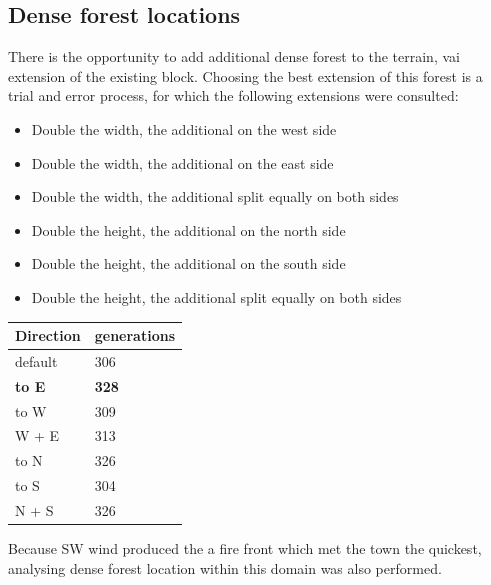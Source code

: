 \documentclass[11pt, a4paper, titlepage]{article}
\begin{document}
      



\subsection{Dense forest locations}
There is the opportunity to add additional dense forest to the terrain, vai extension of the existing block. Choosing the best extension of this forest is a trial and error process, for which the following extensions were consulted:
 \begin{itemize}
   \item Double the width, the additional on the west side
   \item Double the width, the additional on the east side
   \item Double the width, the additional split equally on both sides
   \item Double the height, the additional on the north side
   \item Double the height, the additional on the south side
   \item Double the height, the additional split equally on both sides

 \end{itemize}

 \begin{table}[H]
  \centering
  \begin{tabular}{|l|l|}
  \hline
  Direction & generations \\ \hline
  default & 306 \\ \hline
  \textbf{to E}    & \textbf{328} \\ \hline
  to W    & 309 \\ \hline
  W + E   & 313 \\ \hline
  to N    & 326 \\ \hline
  to S    & 304 \\ \hline
  N + S    & 326 \\ \hline
  
  
  
  
  \end{tabular}
  \end{table}

  Because SW wind produced the a fire front which met the town the quickest, analysing dense forest location within this domain was also performed.
\end{document}
